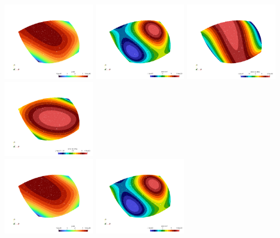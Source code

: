 \newpage
\begin{center}
\includegraphics[width=4cm]{images/mappings/biquadratic3/elt3/jcob.0000.png}
\includegraphics[width=4cm]{images/mappings/biquadratic3/elt3/f.0000.png}
\includegraphics[width=4cm]{images/mappings/biquadratic3/elt3/dfdx.0000.png}
\includegraphics[width=4cm]{images/mappings/biquadratic3/elt3/dfdy.0000.png}\\
\includegraphics[width=4cm]{images/mappings/biquadratic3/elt3/jcob.0001.png}
\includegraphics[width=4cm]{images/mappings/biquadratic3/elt3/f.0001.png}

\end{center}
